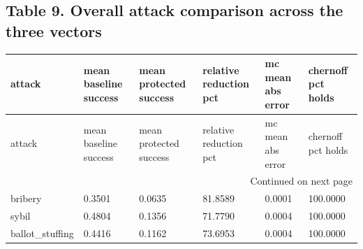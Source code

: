 \documentclass[11pt,a4paper]{article}
\begin{document}
\subsection*{Table 9. Overall attack comparison across the three vectors}
{\scriptsize
\setlength{\tabcolsep}{3pt}
\begin{longtable}{llllll}
\toprule
attack & mean baseline success & mean protected success & relative reduction pct & mc mean abs error & chernoff pct holds \\
\midrule
\endfirsthead
\toprule
attack & mean baseline success & mean protected success & relative reduction pct & mc mean abs error & chernoff pct holds \\
\midrule
\endhead
\midrule
\multicolumn{6}{r}{Continued on next page} \\
\midrule
\endfoot
\bottomrule
\endlastfoot
bribery & 0.3501 & 0.0635 & 81.8589 & 0.0001 & 100.0000 \\
sybil & 0.4804 & 0.1356 & 71.7790 & 0.0004 & 100.0000 \\
ballot\_stuffing & 0.4416 & 0.1162 & 73.6953 & 0.0004 & 100.0000 \\
\end{longtable}

}
\vspace{8pt}
\end{document}
